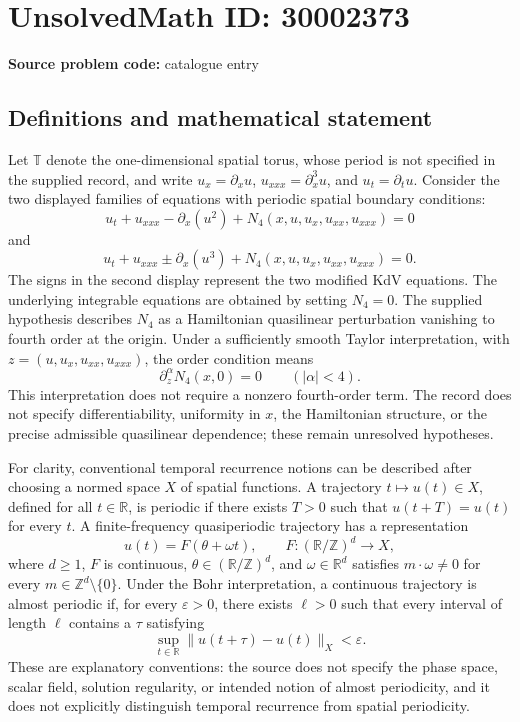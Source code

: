 \documentclass[11pt]{article}
\newcommand{\Z}{\mathbb{Z}}
\newcommand{\R}{\mathbb{R}}
\begin{document}
\section*{UnsolvedMath ID: 30002373}
\textbf{Source problem code:} catalogue entry
\subsection{Definitions and mathematical statement}
Let \(\mathbb T\) denote the one-dimensional spatial torus, whose period is not specified in the supplied record, and write \(u_x=\partial_xu\), \(u_{xxx}=\partial_x^3u\), and \(u_t=\partial_tu\). Consider the two displayed families of equations with periodic spatial boundary conditions:
\[
 u_t+u_{xxx}-\partial_x(u^2)+N_4(x,u,u_x,u_{xx},u_{xxx})=0
\]
and
\[
 u_t+u_{xxx}\pm\partial_x(u^3)+N_4(x,u,u_x,u_{xx},u_{xxx})=0.
\]
The signs in the second display represent the two modified KdV equations. The underlying integrable equations are obtained by setting \(N_4=0\). The supplied hypothesis describes \(N_4\) as a Hamiltonian quasilinear perturbation vanishing to fourth order at the origin. Under a sufficiently smooth Taylor interpretation, with \(z=(u,u_x,u_{xx},u_{xxx})\), the order condition means
\[
 \partial_z^\alpha N_4(x,0)=0\qquad (|\alpha|<4).
\]
This interpretation does not require a nonzero fourth-order term. The record does not specify differentiability, uniformity in \(x\), the Hamiltonian structure, or the precise admissible quasilinear dependence; these remain unresolved hypotheses.

For clarity, conventional temporal recurrence notions can be described after choosing a normed space \(X\) of spatial functions. A trajectory \(t\mapsto u(t)\in X\), defined for all \(t\in\R\), is periodic if there exists \(T>0\) such that \(u(t+T)=u(t)\) for every \(t\). A finite-frequency quasiperiodic trajectory has a representation
\[
 u(t)=F(\theta+\omega t),\qquad F:(\R/\Z)^d\longrightarrow X,
\]
where \(d\geq1\), \(F\) is continuous, \(\theta\in(\R/\Z)^d\), and \(\omega\in\R^d\) satisfies \(m\cdot\omega\neq0\) for every \(m\in\Z^d\setminus\{0\}\). Under the Bohr interpretation, a continuous trajectory is almost periodic if, for every \(\varepsilon>0\), there exists \(\ell>0\) such that every interval of length \(\ell\) contains a \(\tau\) satisfying
\[
 \sup_{t\in\R}\|u(t+\tau)-u(t)\|_X<\varepsilon.
\]
These are explanatory conventions: the source does not specify the phase space, scalar field, solution regularity, or intended notion of almost periodicity, and it does not explicitly distinguish temporal recurrence from spatial periodicity.
\end{document}
